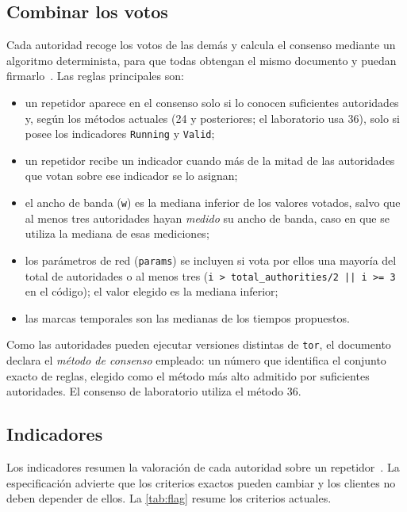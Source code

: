 \subsection{Combinar los votos}

Cada autoridad recoge los votos de las demás y calcula el consenso mediante un algoritmo determinista, para que todas obtengan el mismo documento y puedan firmarlo~. Las reglas principales son:
\begin{itemize}
  \item un repetidor aparece en el consenso solo si lo conocen suficientes autoridades y, según los métodos actuales (24 y posteriores; el laboratorio usa 36), solo si posee los indicadores \texttt{Running} y \texttt{Valid};
  \item un repetidor recibe un indicador cuando más de la mitad de las autoridades que votan sobre ese indicador se lo asignan;
  \item el ancho de banda (\texttt{w}) es la mediana inferior de los valores votados, salvo que al menos tres autoridades hayan \emph{medido} su ancho de banda, caso en que se utiliza la mediana de esas mediciones;
  \item los parámetros de red (\texttt{params}) se incluyen si vota por ellos una mayoría del total de autoridades o al menos tres (\texttt{i > total\_authorities/2 || i >= 3} en el código); el valor elegido es la mediana inferior;
  \item las marcas temporales son las medianas de los tiempos propuestos.
\end{itemize}

Como las autoridades pueden ejecutar versiones distintas de \texttt{tor}, el documento declara el \emph{método de consenso} empleado: un número que identifica el conjunto exacto de reglas, elegido como el método más alto admitido por suficientes autoridades. El consenso de laboratorio utiliza el método 36.

\subsection{Indicadores}\label{sec:dir-flag}

Los indicadores resumen la valoración de cada autoridad sobre un repetidor~. La especificación advierte que los criterios exactos pueden cambiar y los clientes no deben depender de ellos. La \cref{tab:flag} resume los criterios actuales.

